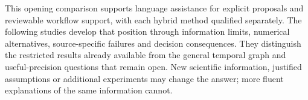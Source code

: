 This opening comparison supports language assistance for explicit proposals
and reviewable workflow support, with each hybrid method qualified separately.
The following studies develop that position through information limits,
numerical alternatives, source-specific failures and decision consequences.
They distinguish the restricted results already available from the general
temporal graph and useful-precision questions that remain open. New scientific
information, justified assumptions or additional experiments may change the
answer; more fluent explanations of the same information cannot.
